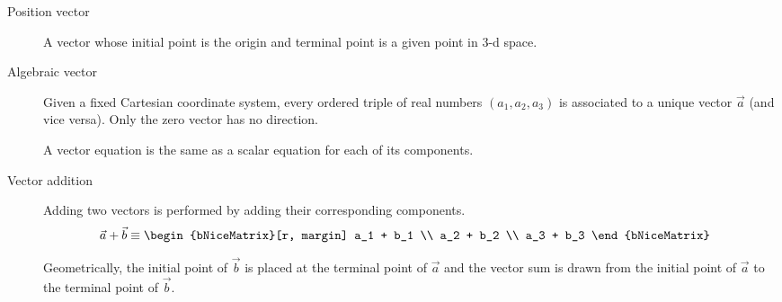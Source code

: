 \begin{description}
    \item[Position vector] A vector whose initial point is the origin and terminal point
          is a given point in 3-d space.

    \item[Algebraic vector] Given a fixed Cartesian coordinate system, every ordered
          triple of real numbers $ (a_1, a_2, a_3) $ is associated to a unique vector
          $ \vec{a} $ (and vice versa). Only the zero vector has no direction. \par
          A vector equation is the same as a scalar equation for each of its components.

    \item[Vector addition] Adding two vectors is performed by adding their
          corresponding components.
          \begin{align}
              \vec{a} + \vec{b} & \equiv \begin{bNiceMatrix}[r, margin]
                                             a_1 + b_1 \\ a_2 + b_2 \\ a_3 + b_3
                                         \end{bNiceMatrix}
          \end{align}

          Geometrically, the initial point of $ \vec{b} $ is placed at the terminal point
          of $ \vec{a} $ and the vector sum is drawn from the initial point of $ \vec{a} $
          to the terminal point of $ \vec{b} $.

          \begin{figure}[H]
              \centering
              \hspace{2in}
          \end{figure}


\end{description}

